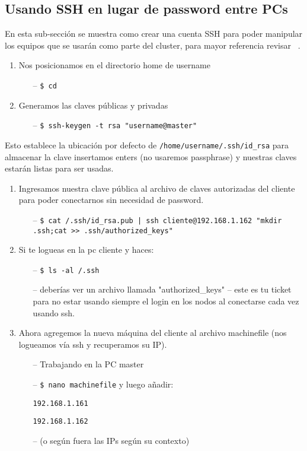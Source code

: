 \documentclass[conference]{IEEEtran}
\begin{document}
\subsection{Usando SSH en lugar de password entre PCs}
En esta sub-sección se muestra como crear una cuenta SSH para poder manipular los
equipos que se usarán como parte del cluster, para mayor referencia revisar
~\cite{how-to-setup-ssh-keys}.
\begin{enumerate}
\item Nos posicionamos en el directorio home de username
  \begin{itemize}
  \item[--] \texttt{\$ cd \texttildelow}
  \end{itemize}
\item Generamos las claves públicas y privadas
  \begin{itemize}
  \item[--] \texttt{\$ ssh-keygen -t rsa "username@master"}
  \end{itemize}
\end{enumerate}
Esto establece la ubicación por defecto de
\texttt{/home/username/.ssh/id\_rsa} para almacenar la clave
insertamos enters (no usaremos passphrase) y nuestras claves estarán
listas para ser usadas.

\begin{enumerate}[resume]
\item Ingresamos nuestra clave pública al archivo de claves autorizadas del cliente
para poder conectarnos sin necesidad de password.
  \begin{itemize}
  \item[--] \texttt{\$ cat \texttildelow/.ssh/id\_rsa.pub | ssh cliente@192.168.1.162 "mkdir .ssh;cat >> .ssh/authorized\_keys"}
  \end{itemize}
\item Si te logueas en la pc cliente y haces:
  \begin{itemize}
  \item[--] \texttt{\$ ls -al \texttildelow/.ssh}
  \item[--] deberías ver un archivo llamada "authorized\_keys" -- este es tu ticket para
no estar usando siempre el login en los nodos al conectarse cada vez usando ssh.
  \end{itemize}
\item Ahora agregemos la nueva máquina del cliente al archivo machinefile
(nos logueamos vía ssh y recuperamos su IP).
  \begin{itemize}
  \item[--] Trabajando en la PC master
  \item[--] \texttt{\$ nano machinefile} y luego añadir:
  \item[] \texttt{192.168.1.161}
  \item[] \texttt{192.168.1.162}
  \item[--] (o según fuera las IPs según su contexto)
  \end{itemize}
\end{enumerate}
\end{document}
